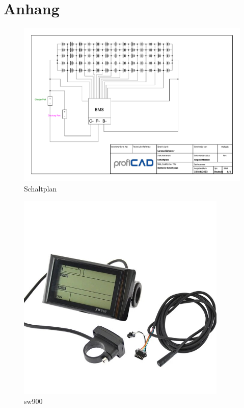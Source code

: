 

\chapter*{Anhang}
\begin{landscape}


\begin{figure}[h]
    \centering
    \includegraphics[width=22cm]{images/Schaltplan.pdf}
    \caption{Schaltplan\cite{lorenz_scherrer_selbst_2023}}%
    \label{fig:5_1}
\end{figure}
\end{landscape}

\begin{figure}[h]
    \centering
    \includegraphics[width=10cm]{images/sw900.jpeg}
    \caption{sw900\cite{lorenz_scherrer_selbst_2023}}%
    \label{fig:15}
\end{figure}


